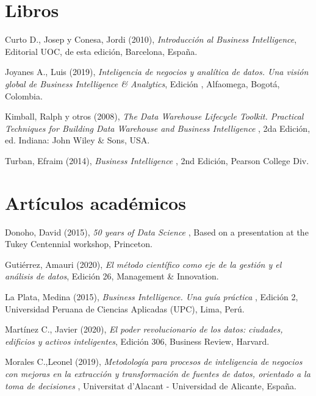 \documentclass[12pt,jou]{apa7}
\begin{document}
\begin{thebibliography}{12}
	
\section{Libros}
	
 Curto D., Josep y Conesa, Jordi (2010), \textit{ Introducción al Business Intelligence}, Editorial UOC, de esta edición, Barcelona, España.

 Joyanes A., Luis (2019), \textit{ Inteligencia de negocios y analítica de datos. Una visión global de Business Intelligence \& Analytics}, Edición , Alfaomega, Bogotá, Colombia.

 Kimball, Ralph y otros (2008), \textit{ The Data Warehouse Lifecycle Toolkit. Practical Techniques for Building Data Warehouse and Business Intelligence }, 2da Edición, ed. Indiana: John Wiley \& Sons, USA.

 Turban, Efraim (2014), \textit{ Business Intelligence }, 2nd Edición, Pearson College Div.
	
\section{Artículos académicos}
 Donoho, David (2015), \textit{ 50 years of Data Science }, Based on a presentation at the Tukey Centennial workshop, Princeton.

 Gutiérrez, Amauri (2020), \textit{El método científico como eje de la gestión y el análisis de datos}, Edición 26, Management \& Innovation.

 La Plata, Medina (2015), \textit{ Business Intelligence. Una guía práctica }, Edición 2, Universidad Peruana de Ciencias Aplicadas (UPC), Lima, Perú.

 Martínez C., Javier (2020), \textit{El poder revolucionario de los datos: ciudades, edificios y activos inteligentes}, Edición 306, Business Review, Harvard.

 Morales C.,Leonel (2019), \textit{ Metodología para procesos de inteligencia de negocios con mejoras en la extracción y transformación de fuentes de datos, orientado a la toma de decisiones }, Universitat d'Alacant - Universidad de Alicante, España.


\end{thebibliography}
\end{document}
